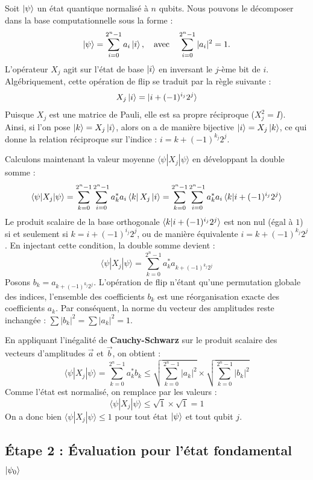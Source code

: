 \documentclass{ceri/sty/rapport}
\begin{document}
\begin{solution}
Soit $\ket{\psi}$ un état quantique normalisé à $n$ qubits. Nous pouvons le décomposer dans la base computationnelle sous la forme :
\[
\ket{\psi} = \sum_{i=0}^{2^n-1} a_i \ket{i}, \quad \text{avec} \quad \sum_{i=0}^{2^n-1} |a_i|^2 = 1.
\]
L'opérateur $X_j$ agit sur l'état de base $\ket{i}$ en inversant le $j$-ème bit de $i$. Algébriquement, cette opération de flip se traduit par la règle suivante :
\[
X_j \ket{i} = \ket{i + (-1)^{i_j}2^j}
\]
Puisque $X_j$ est une matrice de Pauli, elle est sa propre réciproque ($X_j^2 = I$). Ainsi, si l'on pose $\ket{k} = X_j\ket{i}$, alors on a de manière bijective $\ket{i} = X_j\ket{k}$, ce qui donne la relation réciproque sur l'indice : $i = k + (-1)^{k_j}2^j$.

Calculons maintenant la valeur moyenne $\langle \psi | X_j | \psi \rangle$ en développant la double somme :
\[
\langle \psi | X_j | \psi \rangle = \sum_{k=0}^{2^n-1} \sum_{i=0}^{2^n-1} a_k^* a_i \bra{k} X_j \ket{i} = \sum_{k=0}^{2^n-1} \sum_{i=0}^{2^n-1} a_k^* a_i \braket{k | i + (-1)^{i_j}2^j}
\]
Le produit scalaire de la base orthogonale $\braket{k | i + (-1)^{i_j}2^j}$ est non nul (égal à $1$) si et seulement si $k = i + (-1)^{i_j}2^j$, ou de manière équivalente $i = k + (-1)^{k_j}2^j$. En injectant cette condition, la double somme devient :
\[
\langle \psi | X_j | \psi \rangle = \sum_{k=0}^{2^n-1} a_k^* a_{k + (-1)^{k_j}2^j}
\]
Posons $b_k = a_{k + (-1)^{k_j}2^j}$. L'opération de flip n'étant qu'une permutation globale des indices, l'ensemble des coefficients $b_k$ est une réorganisation exacte des coefficients $a_k$. Par conséquent, la norme du vecteur des amplitudes reste inchangée : $\sum |b_k|^2 = \sum |a_k|^2 = 1$.

En appliquant l'inégalité de \textbf{Cauchy-Schwarz} sur le produit scalaire des vecteurs d'amplitudes $\vec{a}$ et $\vec{b}$, on obtient :
\[
\langle \psi | X_j | \psi \rangle = \sum_{k=0}^{2^n-1} a_k^* b_k \leq \sqrt{\sum_{k=0}^{2^n-1} |a_k|^2} \times \sqrt{\sum_{k=0}^{2^n-1} |b_k|^2}
\]
Comme l'état est normalisé, on remplace par les valeurs :
\[
\langle \psi | X_j | \psi \rangle \leq \sqrt{1} \times \sqrt{1} = 1
\]
On a donc bien $\langle \psi | X_j | \psi \rangle \leq 1$ pour tout état $\ket{\psi}$ et tout qubit $j$.

\subsection*{Étape 2 : Évaluation pour l'état fondamental $\ket{\psi_0}$}


\end{solution}
\end{document}
